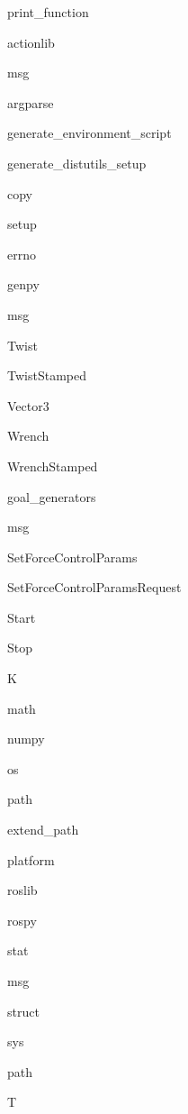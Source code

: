 \begin{DoxyCompactList}
\item print\+\_\+function\item actionlib\item msg\item argparse\item generate\+\_\+environment\+\_\+script\item generate\+\_\+distutils\+\_\+setup\item copy\item setup\item errno\item genpy\item msg\item Twist\item Twist\+Stamped\item Vector3\item Wrench\item Wrench\+Stamped\item goal\+\_\+generators\item msg\item Set\+Force\+Control\+Params\item Set\+Force\+Control\+Params\+Request\item Start\item Stop\item K\item math\item numpy\item os\item path\item extend\+\_\+path\item platform\item roslib\item rospy\item stat\item msg\item struct\item sys\item path\item T\end{DoxyCompactList}
